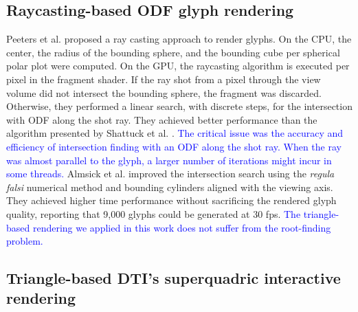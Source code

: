 \documentclass[twoside,twocolumn,10pt]{article}
\begin{document}


 \subsection{Raycasting-based ODF glyph rendering}

Peeters et al. \cite{peeters2009} proposed a ray casting approach to render glyphs. On the CPU, the center, the radius of the bounding sphere, and the bounding cube per spherical polar plot were computed. On the GPU, the raycasting algorithm is executed per pixel in the fragment shader. If the ray shot from a pixel through the view volume did not intersect the bounding sphere, the fragment was discarded. Otherwise, they performed a linear search, with discrete steps, for the intersection with ODF along the shot ray. They achieved better performance than the algorithm presented by Shattuck et al. \cite{shattuck2008}.  \textcolor{blue}{The critical issue was the accuracy and efficiency of intersection finding with an ODF along the shot ray. When the ray was almost parallel to the glyph, a larger number of iterations might incur in some threads.} Almsick et al. \cite{almsick2011} improved the intersection search using the \textit{regula falsi} numerical method and bounding cylinders aligned with the viewing axis. They achieved higher time performance without sacrificing the rendered glyph quality, reporting that 9,000 glyphs could be generated at 30 fps.  \textcolor{blue}{The triangle-based rendering we applied in this work does not suffer from the root-finding problem.} 



\subsection{Triangle-based DTI's superquadric interactive rendering}
\label{ssec:superquadric_rendering}
\end{document}
